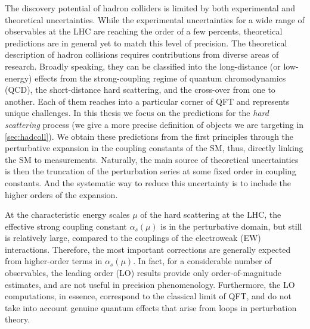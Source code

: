 The discovery potential of hadron colliders is limited by both experimental and theoretical uncertainties.
While the experimental uncertainties for a wide range of observables at the LHC are reaching the order of a few percents,
theoretical predictions are in general yet to match this level of precision.
The theoretical description of hadron collisions requires contributions from diverse areas of research.
Broadly speaking, they can be classified into the long-distance (or low-energy) effects from 
the strong-coupling regime of quantum chromodynamics (QCD), the short-distance hard scattering, and
the cross-over from one to another.
Each of them reaches into a particular corner of QFT and represents unique challenges.
In this thesis we focus on the predictions for the \emph{hard scattering} process (we give a more precise definition of objects we are targeting in \cref{sec:hadcoll}).
We obtain these predictions from the first principles through the perturbative expansion in the coupling constants of the SM, thus, directly linking the SM to measurements.
Naturally, the main source of theoretical uncertainties is then the truncation
of the perturbation series at some fixed order in coupling constants.
And the systematic way to reduce this uncertainty is to include the higher orders of the expansion.

At the characteristic energy scales $\mu$ of the hard scattering at the LHC, the effective strong coupling constant $\alpha_s(\mu)$
is in the perturbative domain, but still is relatively large, compared to the couplings of the electroweak (EW) interactions.
Therefore, the most important corrections are generally expected from higher-order terms in $\alpha_s(\mu)$.
In fact, for a considerable number of observables,
the leading order (LO) results provide only order-of-magnitude estimates, and are not useful in precision phenomenology.
Furthermore, the LO computations, in essence, correspond to the classical limit of QFT, and do not take into account
genuine quantum effects that arise from loops in perturbation theory.

